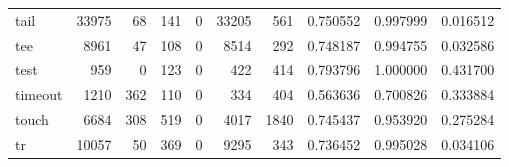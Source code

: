 \begin{longtable}{lrrrrrrrrr}
tail      &                                              33975 &                                                 68 &                                                141 &                                                  0 &                                              33205 &                                                561 &                                           0.750552 &                               0.997999 &                             0.016512 \\
tee       &                                               8961 &                                                 47 &                                                108 &                                                  0 &                                               8514 &                                                292 &                                           0.748187 &                               0.994755 &                             0.032586 \\
test      &                                                959 &                                                  0 &                                                123 &                                                  0 &                                                422 &                                                414 &                                           0.793796 &                               1.000000 &                             0.431700 \\
timeout   &                                               1210 &                                                362 &                                                110 &                                                  0 &                                                334 &                                                404 &                                           0.563636 &                               0.700826 &                             0.333884 \\
touch     &                                               6684 &                                                308 &                                                519 &                                                  0 &                                               4017 &                                               1840 &                                           0.745437 &                               0.953920 &                             0.275284 \\
tr        &                                              10057 &                                                 50 &                                                369 &                                                  0 &                                               9295 &                                                343 &                                           0.736452 &                               0.995028 &                             0.034106 \\

\end{longtable}
